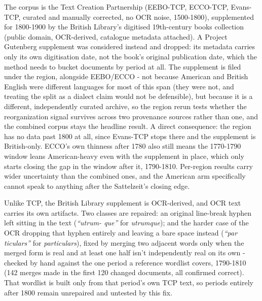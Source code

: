 \documentclass[11pt]{article}
\begin{document}
\begin{claimbox}
 The corpus is the Text Creation
Partnership (EEBO-TCP, ECCO-TCP, Evans-TCP, curated and manually
corrected, no OCR noise, 1500-1800), supplemented for 1800-1900 by the
British Library's digitised 19th-century books collection (public
domain, OCR-derived, catalogue metadata attached). A Project Gutenberg
supplement was considered instead and dropped: its metadata carries only
its own digitisation date, not the book's original publication date,
which the method needs to bucket documents by period at all. The
supplement is filed under the  region, alongside EEBO/ECCO
- not because American and British English were different languages for
most of this span (they were not, and treating the split as a dialect
claim would not be defensible), but because it is a different,
independently curated archive, so the region rerun tests whether the
reorganization signal survives across two provenance sources rather than
one, and the combined corpus stays the headline result. A direct
consequence: the  region has no data past 1800 at all,
since Evans-TCP stops there and the supplement is British-only. ECCO's
own thinness after 1780 also still means the 1770-1790 window leans
American-heavy even with the supplement in place, which only starts
closing the gap in the window after it, 1790-1810. Per-region results
carry wider uncertainty than the combined ones, and the American arm
specifically cannot speak to anything after the Sattelzeit's closing
edge.
\end{claimbox}

\begin{claimbox}
 Unlike TCP, the British Library supplement
is OCR-derived, and OCR text carries its own artifacts. Two classes are
repaired: an original line-break hyphen left sitting in the text
(\emph{``utrum- que''} for \emph{utrumque}); and the harder case of the
OCR dropping that hyphen entirely and leaving a bare space instead
(\emph{``par ticulars''} for \emph{particulars}), fixed by merging two
adjacent words only when the merged form is real and at least one half
isn't independently real on its own - checked by hand against the one
period a reference wordlist covers, 1790-1810 (142 merges made in the
first 120 changed documents, all confirmed correct). That wordlist is
built only from that period's own TCP text, so periods entirely after
1800 remain unrepaired and untested by this fix.
\end{claimbox}
\end{document}
